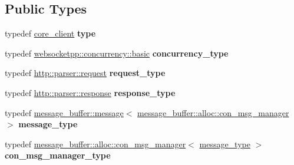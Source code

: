\subsection*{Public Types}
\begin{DoxyCompactItemize}
\item 
typedef \hyperlink{structwebsocketpp_1_1config_1_1core__client}{core\+\_\+client} {\bfseries type}\hypertarget{structwebsocketpp_1_1config_1_1core__client_a0d7afa0193a253a7afa8b8f3cc914019}{}\label{structwebsocketpp_1_1config_1_1core__client_a0d7afa0193a253a7afa8b8f3cc914019}

\item 
typedef \hyperlink{classwebsocketpp_1_1concurrency_1_1basic}{websocketpp\+::concurrency\+::basic} {\bfseries concurrency\+\_\+type}\hypertarget{structwebsocketpp_1_1config_1_1core__client_a4efeeb870e648c7405daab92d10fa5d6}{}\label{structwebsocketpp_1_1config_1_1core__client_a4efeeb870e648c7405daab92d10fa5d6}

\item 
typedef \hyperlink{classwebsocketpp_1_1http_1_1parser_1_1request}{http\+::parser\+::request} {\bfseries request\+\_\+type}\hypertarget{structwebsocketpp_1_1config_1_1core__client_a1fd74b16e3add246b1c356f6f14f206b}{}\label{structwebsocketpp_1_1config_1_1core__client_a1fd74b16e3add246b1c356f6f14f206b}

\item 
typedef \hyperlink{classwebsocketpp_1_1http_1_1parser_1_1response}{http\+::parser\+::response} {\bfseries response\+\_\+type}\hypertarget{structwebsocketpp_1_1config_1_1core__client_a5d8d6a90c7f36442a61a615da2ac8dcc}{}\label{structwebsocketpp_1_1config_1_1core__client_a5d8d6a90c7f36442a61a615da2ac8dcc}

\item 
typedef \hyperlink{classwebsocketpp_1_1message__buffer_1_1message}{message\+\_\+buffer\+::message}$<$ \hyperlink{classwebsocketpp_1_1message__buffer_1_1alloc_1_1con__msg__manager}{message\+\_\+buffer\+::alloc\+::con\+\_\+msg\+\_\+manager} $>$ {\bfseries message\+\_\+type}\hypertarget{structwebsocketpp_1_1config_1_1core__client_ae370adc4110d5d6c709167462467b11c}{}\label{structwebsocketpp_1_1config_1_1core__client_ae370adc4110d5d6c709167462467b11c}

\item 
typedef \hyperlink{classwebsocketpp_1_1message__buffer_1_1alloc_1_1con__msg__manager}{message\+\_\+buffer\+::alloc\+::con\+\_\+msg\+\_\+manager}$<$ \hyperlink{classwebsocketpp_1_1message__buffer_1_1message}{message\+\_\+type} $>$ {\bfseries con\+\_\+msg\+\_\+manager\+\_\+type}\hypertarget{structwebsocketpp_1_1config_1_1core__client_ae5d0b586e86a2520bdefe60d61849d37}{}\label{structwebsocketpp_1_1config_1_1core__client_ae5d0b586e86a2520bdefe60d61849d37}


\end{DoxyCompactItemize}
